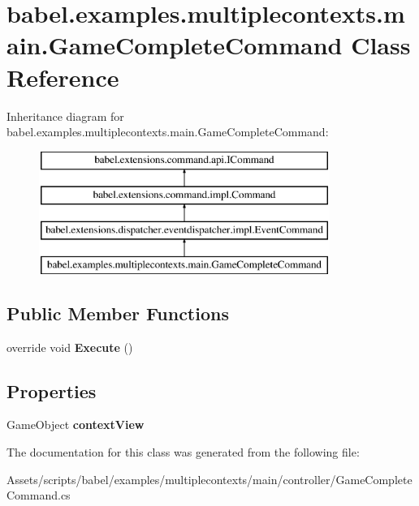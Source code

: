 \hypertarget{classbabel_1_1examples_1_1multiplecontexts_1_1main_1_1_game_complete_command}{\section{babel.\-examples.\-multiplecontexts.\-main.\-Game\-Complete\-Command Class Reference}
\label{classbabel_1_1examples_1_1multiplecontexts_1_1main_1_1_game_complete_command}
}
Inheritance diagram for babel.\-examples.\-multiplecontexts.\-main.\-Game\-Complete\-Command\-:\begin{figure}[H]
\begin{center}
\leavevmode
\includegraphics[height=4.000000cm]{classbabel_1_1examples_1_1multiplecontexts_1_1main_1_1_game_complete_command}
\end{center}
\end{figure}
\subsection*{Public Member Functions}
\begin{DoxyCompactItemize}
\item 
\hypertarget{classbabel_1_1examples_1_1multiplecontexts_1_1main_1_1_game_complete_command_a450e6a8bb8c5aebffef7c70b0ecca120}{override void {\bfseries Execute} ()}\label{classbabel_1_1examples_1_1multiplecontexts_1_1main_1_1_game_complete_command_a450e6a8bb8c5aebffef7c70b0ecca120}

\end{DoxyCompactItemize}
\subsection*{Properties}
\begin{DoxyCompactItemize}
\item 
\hypertarget{classbabel_1_1examples_1_1multiplecontexts_1_1main_1_1_game_complete_command_a0f191de11219b550ea4bd3ea9adcc979}{Game\-Object {\bfseries context\-View}}\label{classbabel_1_1examples_1_1multiplecontexts_1_1main_1_1_game_complete_command_a0f191de11219b550ea4bd3ea9adcc979}

\end{DoxyCompactItemize}


The documentation for this class was generated from the following file\-:\begin{DoxyCompactItemize}
\item 
Assets/scripts/babel/examples/multiplecontexts/main/controller/Game\-Complete\-Command.\-cs\end{DoxyCompactItemize}
